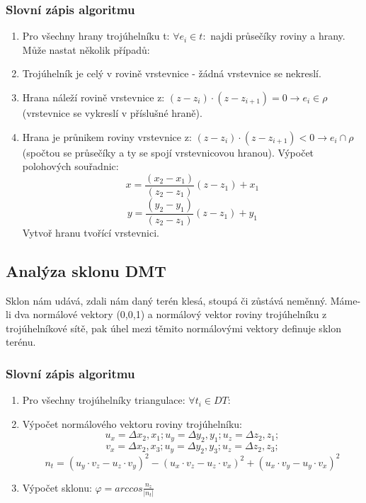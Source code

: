 \documentclass[a4paper,11pt,twoside]{article}
\begin{document}
\subsubsection{Slovní zápis algoritmu}
\begin{enumerate}
\item Pro všechny hrany trojúhelníku t: $ \forall e_i \in t: $ najdi průsečíky roviny a hrany. Může nastat několik případů:
\item Trojúhelník je celý v rovině vrstevnice - žádná vrstevnice se nekreslí.
\item Hrana náleží rovině vrstevnice z: $ (z - z_i) \cdot (z - z_{i+1}) = 0 \rightarrow e_i \in \rho $ (vrstevnice se vykreslí v příslušné hraně).
\item Hrana je průnikem roviny vrstevnice z: $ (z - z_i) \cdot (z - z_{i+1}) < 0 \rightarrow e_i \cap \rho $ (spočtou se průsečíky a ty se spojí vrstevnicovou hranou).
\subitem Výpočet polohových souřadnic: 
$$  x = \frac{(x_2 - x_1)}{(z_2 - z_1)} (z - z_1) + x_1 $$ 
$$  y = \frac{(y_2 - y_1)}{(z_2 - z_1)} (z - z_1) + y_1 $$ 
\subitem Vytvoř hranu tvořící vrstevnici.
\end{enumerate}

\subsection{Analýza sklonu DMT}
Sklon nám udává, zdali nám daný terén klesá, stoupá či zůstává neměnný. Máme-li dva normálové vektory (0,0,1) a normálový vektor roviny trojúhelníku z trojúhelníkové sítě, pak úhel mezi těmito normálovými vektory definuje sklon terénu.

\subsubsection{Slovní zápis algoritmu}
\begin{enumerate}
\item Pro všechny trojúhelníky triangulace: $ \forall t_i \in DT: $
\item Výpočet normálového vektoru roviny trojúhelníku:
$$  u_x = \Delta x_2, x_1; u_y = \Delta y_2, y_1; u_z = \Delta z_2, z_1;$$
$$  v_x = \Delta x_2, x_3; u_y = \Delta y_2, y_3; u_z = \Delta z_2, z_3;$$
 $$ n_t = (u_y \cdot v_z - u_z \cdot v_y)^2 - (u_x \cdot v_z - u_z \cdot v_x)^2  + (u_x \cdot v_y - u_y \cdot v_x)^2 $$
\item Výpočet sklonu: $ \varphi = arccos \frac{n_z}{|n_t|} $
\end{enumerate}
\end{document}
